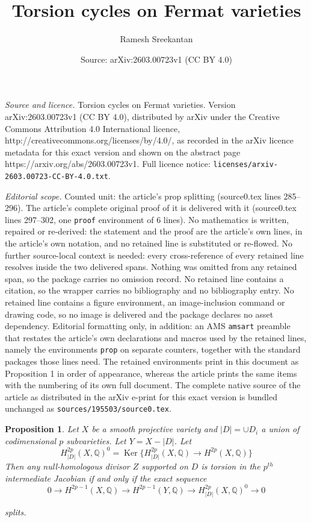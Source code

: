 \documentclass[10pt,a4paper]{amsart}
\title{Torsion cycles on Fermat varieties}
\author{Ramesh Sreekantan}
\date{Source: arXiv:2603.00723v1 (CC BY 4.0)}
\newtheorem{prop}{Proposition}
\def\Ker{\operatorname{Ker}}
\newcommand {\Q}{{\mathds Q}}
\begin{document}
\maketitle

\noindent\emph{Source and licence.} Torsion cycles on Fermat varieties. Version arXiv:2603.00723v1 (CC BY 4.0), distributed by arXiv under the Creative Commons Attribution 4.0 International licence, http://creativecommons.org/licenses/by/4.0/, as recorded in the arXiv licence metadata for this exact version and shown on the abstract page https://arxiv.org/abs/2603.00723v1. Full licence notice: \texttt{licenses/arxiv-2603.00723-CC-BY-4.0.txt}.\par\smallskip

\noindent\textit{Editorial scope.} Counted unit: the article's prop splitting (source0.tex lines 285--296). The article's complete original proof of it is delivered with it (source0.tex lines 297--302, one \texttt{proof} environment of 6 lines). No mathematics is written, repaired or re-derived: the statement and the proof are the article's own lines, in the article's own notation, and no retained line is substituted or re-flowed.  No further source-local context is needed: every cross-reference of every retained line resolves inside the two delivered spans.  Nothing was omitted from any retained span, so the package carries no omission record.  No retained line contains a citation, so the wrapper carries no bibliography and no bibliography entry.  No retained line contains a figure environment, an image-inclusion command or drawing code, so no image is delivered and the package declares no asset dependency.  Editorial formatting only, in addition: an AMS \texttt{amsart} preamble that restates the article's own declarations and macros used by the retained lines, namely the environments \texttt{prop} on separate counters, together with the standard packages those lines need.  The retained environments print in this document as Proposition 1 in order of appearance, whereas the article prints the same items with the numbering of its own full document.  The complete native source of the article as distributed in the arXiv e-print for this exact version is bundled unchanged as \texttt{sources/195503/source0.tex}.
	\begin{prop} Let $X$ be a smooth projective variety and $|D|=\cup D_i$ a union of codimensional $p$ subvarieties. Let $Y=X-|D|$. Let 
		$$H^{2p}_{|D|}(X,\Q)^0= \Ker\{H^{2p}_{|D|}(X,\Q) \rightarrow H^{2p}(X,\Q)\}$$
		Then any null-homologous divisor $Z$ supported on $D$ is torsion in the $p^{th}$ intermediate Jacobian if and only if the exact sequence 
		$$0 \rightarrow H^{2p-1}(X,\Q) \rightarrow  H^{2p-1}(Y,\Q) \rightarrow H^{2p}_{|D|}(X,\Q)^0 \rightarrow 0$$
	
		splits.  
		\label{splitting}
		
	\end{prop}
\end{document}
